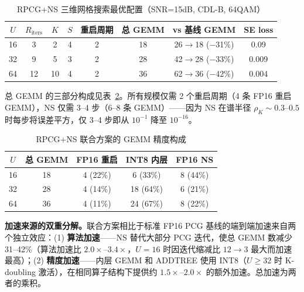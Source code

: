 \documentclass{CjC}
\begin{document}
    \begin{table}[H]
        \centering
        \caption{RPCG+NS 三维网格搜索最优配置（SNR=15dB, CDL-B, 64QAM）}
        \label{tab:rpcgns-optimal}
        \begin{tabular}{c c c c c c c c}
            \toprule $U$ & $R_{\text{iters}}$ & $K$ & $S$ & 重启周期 & 总 GEMM & vs 基线 GEMM & SE loss \\
            \midrule 16 & 3  & 2  & 4 & 2 & 18 & 26$\rightarrow$18 ($-$31\%) & 0.09   \\
            32          & 9  & 5  & 3 & 2 & 28 & 42$\rightarrow$28 ($-$33\%) & 0.009  \\
            64          & 12 & 10 & 4 & 2 & 36 & 62$\rightarrow$36 ($-$42\%) & 0.004  \\
            \bottomrule
        \end{tabular}
    \end{table}
    
    总 GEMM 的三部分构成见表~\ref{tab:rpcgns-breakdown}。所有规模仅需 2 个重启周期（4 条 FP16 重启 GEMM），NS 仅需 3--4 步（6--8 条 GEMM）——因为 NS 在谱半径 $\rho_{K}\sim0.3$--$0.5$ 时每步将误差平方，仅 3--4 步即从 $10^{-1}$ 降至 $10^{-16}$。
    
    \begin{table}[H]
        \centering
        \caption{RPCG+NS 联合方案的 GEMM 精度构成}
        \label{tab:rpcgns-breakdown}
        \begin{tabular}{c c c c c}
            \toprule $U$ & 总 GEMM & FP16 重启 & INT8 内层 & FP16 NS \\
            \midrule 16 & 18 & 4 (22\%)  & 6 (33\%)  & 8 (44\%) \\
            32          & 28 & 4 (14\%)  & 18 (64\%) & 6 (21\%) \\
            64          & 36 & 4 (11\%)  & 24 (67\%) & 8 (22\%) \\
            \bottomrule
        \end{tabular}
    \end{table}
    
    \textbf{加速来源的双重分解。}联合方案相比于标准 FP16 PCG 基线的端到端加速来自两个独立效应：(1) \textbf{算法加速}——NS 替代大部分 PCG 迭代，使总 GEMM 数减少 31--42\%（算法加速比 $2.0\times$--$3.4\times$，$U=16$ 时因迭代缩减比 $12\rightarrow 3$ 最大而加速最高）；(2) \textbf{精度加速}——内层 GEMM 和 ADDTREE 使用 INT8（$U\ge32$ 时 K-doubling 激活），在相同算子结构下提供约 $1.5\times$--$2.0\times$ 的额外加速。总加速为两者的乘积。
    
\end{document}
